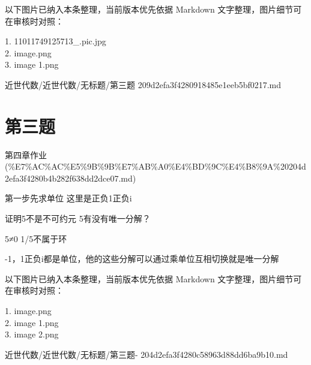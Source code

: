 \begin{note}[关联图片]
以下图片已纳入本条整理，当前版本优先依据 Markdown 文字整理，图片细节可在审核时对照：

1. 11011749125713\_.pic.jpg\\
2. image.png\\
3. image 1.png\\

\end{note}

\begin{note}[来源路径]

近世代数/近世代数/无标题/第三题 209d2efa3f4280918485e1eeb5bf0217.md

\end{note}

\section*{第三题}

\begin{note}[来源上级主题]

第四章作业 (\%E7\%AC\%AC\%E5\%9B\%9B\%E7\%AB\%A0\%E4\%BD\%9C\%E4\%B8\%9A\%20204d2efa3f4280b4b282f638dd2dce07.md)

\end{note}

\begin{homework}

第一步先求单位 这里是正负1正负i

证明5不是不可约元 5有没有唯一分解？

5≠0 1/5不属于环

-1，1正负i都是单位，他的这些分解可以通过乘单位互相切换就是唯一分解

\end{homework}

\begin{note}[关联图片]
以下图片已纳入本条整理，当前版本优先依据 Markdown 文字整理，图片细节可在审核时对照：

1. image.png\\
2. image 1.png\\
3. image 2.png\\

\end{note}

\begin{note}[来源路径]

近世代数/近世代数/无标题/第三题- 204d2efa3f4280c58963d88dd6ba9b10.md

\end{note}


